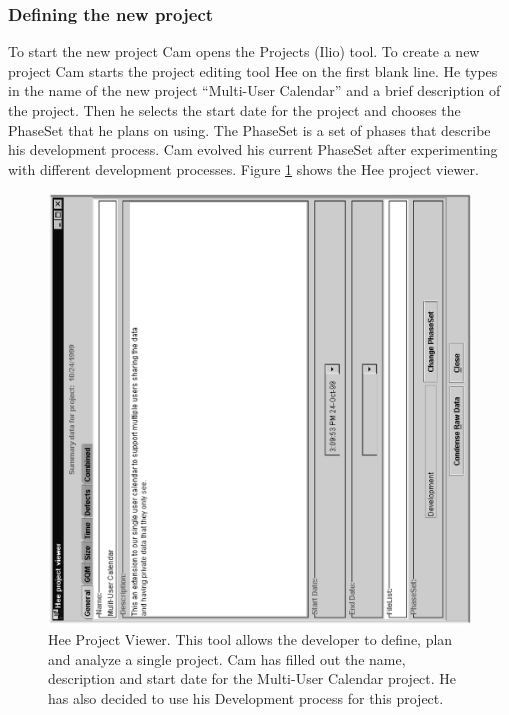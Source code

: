 \subsubsection*{Defining the new project}
To start the new project Cam opens the Projects (Ilio) tool.  To create a new
project Cam starts the project editing tool Hee on the first blank line. He
types in the name of the new project ``Multi-User Calendar'' and a brief
description of the project.  Then he selects the start date for the project and 
chooses the PhaseSet that he plans on using.  The PhaseSet is a set of phases
that describe his development process.  Cam evolved his current PhaseSet after
experimenting with different development processes.  Figure \ref{fig:hee-start} shows
the Hee project viewer.
\begin{figure}[p]
  \centering
  \includegraphics[angle=270,width=6in,bb=45 130 600 665]{hee-main.ps}
  \caption{Hee Project Viewer.  This tool allows the developer to define, plan
  and analyze a single project. Cam has filled out the name, description and
  start date for the Multi-User Calendar project.  He has also decided to use his
  Development process for this project.}
  \label{fig:hee-start}
\end{figure}

